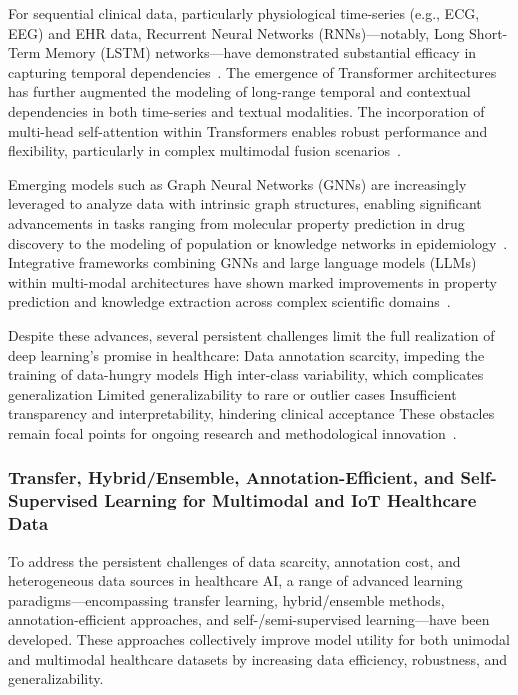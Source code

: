 \documentclass[sigconf]{acmart}
\begin{document}
For sequential clinical data, particularly physiological time-series (e.g., ECG, EEG) and EHR data, Recurrent Neural Networks (RNNs)—notably, Long Short-Term Memory (LSTM) networks—have demonstrated substantial efficacy in capturing temporal dependencies~\cite{ref29, ref42, ref43, ref55}. The emergence of Transformer architectures has further augmented the modeling of long-range temporal and contextual dependencies in both time-series and textual modalities. The incorporation of multi-head self-attention within Transformers enables robust performance and flexibility, particularly in complex multimodal fusion scenarios~\cite{ref28, ref31, ref35, ref48, ref49, ref54, ref65, ref76, ref77, ref90}.

Emerging models such as Graph Neural Networks (GNNs) are increasingly leveraged to analyze data with intrinsic graph structures, enabling significant advancements in tasks ranging from molecular property prediction in drug discovery to the modeling of population or knowledge networks in epidemiology~\cite{ref33, ref35, ref57}. Integrative frameworks combining GNNs and large language models (LLMs) within multi-modal architectures have shown marked improvements in property prediction and knowledge extraction across complex scientific domains~\cite{ref33}.

Despite these advances, several persistent challenges limit the full realization of deep learning’s promise in healthcare:
Data annotation scarcity, impeding the training of data-hungry models
High inter-class variability, which complicates generalization
Limited generalizability to rare or outlier cases
Insufficient transparency and interpretability, hindering clinical acceptance
These obstacles remain focal points for ongoing research and methodological innovation~\cite{ref30, ref41, ref49, ref53, ref54, ref56, ref65, ref71}.

\subsubsection{Transfer, Hybrid/Ensemble, Annotation-Efficient, and Self-Supervised Learning for Multimodal and IoT Healthcare Data}

To address the persistent challenges of data scarcity, annotation cost, and heterogeneous data sources in healthcare AI, a range of advanced learning paradigms—encompassing transfer learning, hybrid/ensemble methods, annotation-efficient approaches, and self-/semi-supervised learning—have been developed. These approaches collectively improve model utility for both unimodal and multimodal healthcare datasets by increasing data efficiency, robustness, and generalizability.
\end{document}
